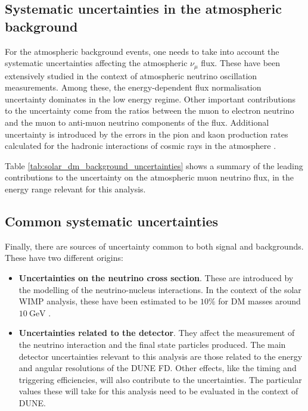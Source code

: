 \subsection{Systematic uncertainties in the atmospheric background}

For the atmospheric background events, one needs to take into account the systematic uncertainties affecting the atmospheric $\nu_{\mu}$ flux. These have been extensively studied in the context of atmospheric neutrino oscillation measurements. Among these, the energy-dependent flux normalisation uncertainty dominates in the low energy regime. Other important contributions to the uncertainty come from the ratios between the muon to electron neutrino and the muon to anti-muon neutrino components of the flux. Additional uncertainty is introduced by the errors in the pion and kaon production rates calculated for the hadronic interactions of cosmic rays in the atmosphere \cite{Honda2006}.

Table \ref{tab:solar_dm_background_uncertainties} shows a summary of the leading contributions to the uncertainty on the atmospheric muon neutrino flux, in the energy range relevant for this analysis.

\subsection{Common systematic uncertainties}

Finally, there are sources of uncertainty common to both signal and backgrounds. These have two different origins:

\begin{itemize}
	\item \textbf{Uncertainties on the neutrino cross section}. These are introduced by the modelling of the neutrino-nucleus interactions. In the context of the solar WIMP analysis, these have been estimated to be $10\%$ for DM masses around $10~\mathrm{GeV}$ \cite{Boliev2013}.
	\item \textbf{Uncertainties related to the detector}. They affect the measurement of the neutrino interaction and the final state particles produced. The main detector uncertainties relevant to this analysis are those related to the energy and angular resolutions of the DUNE FD. Other effects, like the timing and triggering efficiencies, will also contribute to the uncertainties. The particular values these will take for this analysis need to be evaluated in the context of DUNE.
\end{itemize}

